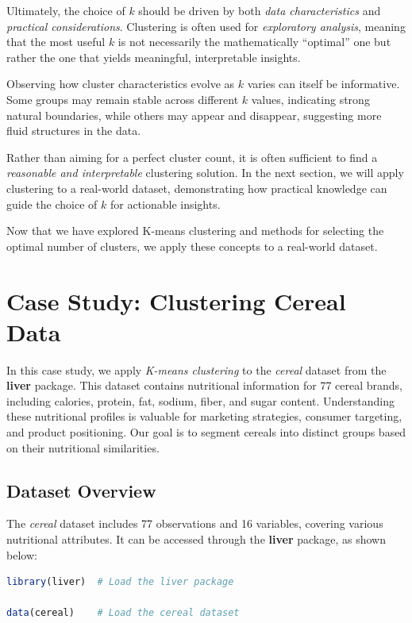 \documentclass[
  11pt,
]{book}
\theoremstyle{definition}
\theoremstyle{definition}
\theoremstyle{definition}
\theoremstyle{definition}
\theoremstyle{remark}
\begin{document}
Ultimately, the choice of \(k\) should be driven by both \emph{data characteristics} and \emph{practical considerations}. Clustering is often used for \emph{exploratory analysis}, meaning that the most useful \(k\) is not necessarily the mathematically ``optimal'' one but rather the one that yields meaningful, interpretable insights.

Observing how cluster characteristics evolve as \(k\) varies can itself be informative. Some groups may remain stable across different \(k\) values, indicating strong natural boundaries, while others may appear and disappear, suggesting more fluid structures in the data.

Rather than aiming for a perfect cluster count, it is often sufficient to find a \emph{reasonable and interpretable} clustering solution. In the next section, we will apply clustering to a real-world dataset, demonstrating how practical knowledge can guide the choice of \(k\) for actionable insights.

Now that we have explored K-means clustering and methods for selecting the optimal number of clusters, we apply these concepts to a real-world dataset.

\section{Case Study: Clustering Cereal Data}\label{kmeans-cereal}

In this case study, we apply \emph{K-means clustering} to the \emph{cereal} dataset from the \textbf{liver} package. This dataset contains nutritional information for 77 cereal brands, including calories, protein, fat, sodium, fiber, and sugar content. Understanding these nutritional profiles is valuable for marketing strategies, consumer targeting, and product positioning. Our goal is to segment cereals into distinct groups based on their nutritional similarities.

\subsection{Dataset Overview}\label{dataset-overview}

The \emph{cereal} dataset includes 77 observations and 16 variables, covering various nutritional attributes. It can be accessed through the \textbf{liver} package, as shown below:

\begin{lstlisting}[language=R]
library(liver)  # Load the liver package

data(cereal)    # Load the cereal dataset
\end{lstlisting}
\end{document}

